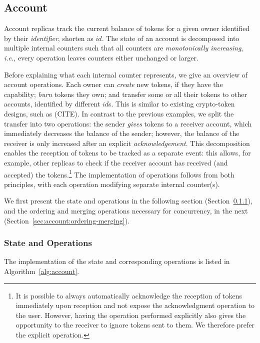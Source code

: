 \documentclass[9pt, oneside]{article}   	%
\begin{document}
\subsection{Account}
\label{sec:account}

Account replicas track the current balance of tokens for a given owner identified by their \textit{identifier}, shorten as $id$. The state of an account is decomposed into multiple internal counters such that all counters are \textit{monotonically increasing}, \textit{i.e.}, every operation leaves counters either unchanged or larger. 

Before explaining what each internal counter represents, we give an overview of account operations. Each owner can  \textit{create} new tokens, if they have the capability; \textit{burn} tokens they own; and transfer some or all their tokens to other accounts, identified by different $id$s. This is similar to existing crypto-token designs, such as (CITE). In contrast to the previous examples, we split the transfer into two operations: the sender \textit{gives} tokens to a receiver account, which immediately decreases the balance of the sender; however, the balance of the receiver is only increased after an explicit \textit{acknowledgement}. This decomposition enables the reception of tokens to be tracked as a separate event: this allows, for example, other replicas to check if the receiver account has received (and accepted) the tokens.\footnote{It is possible to always automatically acknowledge the reception of tokens immediately upon reception and not expose the acknowledgment operation to the user. However, having the operation performed explicitly also gives the opportunity to the receiver to ignore tokens sent to them. We therefore prefer the explicit operation.} The implementation of operations follows from both principles, with each operation modifying separate internal counter(s). 

We first present the state and operations in the following section (Section~\ref{sec:account:state-operations}), and the ordering and merging operations necessary for concurrency, in the next (Section~\ref{sec:account:ordering-merging}).

\subsubsection{State and Operations}
\label{sec:account:state-operations}

The implementation of the state and corresponding operations is listed in Algorithm~\ref{alg:account}. 
\end{document}
